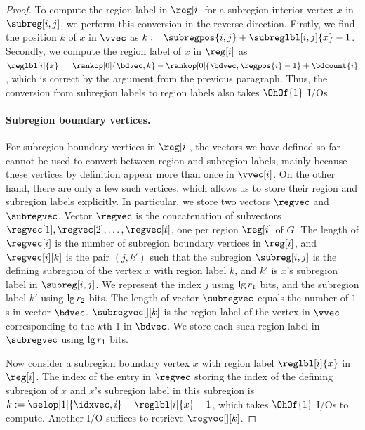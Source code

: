 \begin{proof}
  To compute the region label in $\reg[i]$ for a subregion-interior
  vertex $x$ in $\subreg[i,j]$, we perform this conversion in the reverse
  direction.
  Firstly, we find the position $k$ of $x$ in $\vvec$ as
  $k := \subregpos{i,j} + \subreglbl[i,j]{x} - 1$.
  Secondly, we compute the region label of $x$ in $\reg[i]$ as
  $\reglbl[i]{x} := \rankop[0]{\bdvec,k} - \rankop[0]{\bdvec,\regpos{i}-1} + \bdcount{i}$,
  which is correct by the argument from the previous paragraph.
  Thus, the conversion from subregion labels to region labels also takes
  $\OhOf{1}$ I/Os.

  \paragraph{Subregion boundary vertices.}

  For subregion boundary vertices in $\reg[i]$, the vectors we have defined so
  far cannot be used to convert between region and subregion labels, mainly
  because these vertices by definition appear more than once in $\vvec[i]$.
  On the other hand, there are only a few such vertices, which allows us to
  store their region and subregion labels explicitly.
  In particular, we store two vectors $\regvec$ and~$\subregvec$.
  Vector $\regvec$ is the concatenation of subvectors $\regvec[1], \regvec[2],
  \dots, \regvec[t]$, one per region $\reg[i]$ of $G$.
  The length of $\regvec[i]$ is the number of subregion boundary vertices
  in $\reg[i]$, and $\regvec[i][k]$ is the pair $(j,k')$ such that the
  subregion $\subreg[i,j]$ is the defining subregion of the vertex $x$
  with region label $k$, and $k'$ is $x$'s subregion label in $\subreg[i,j]$.
  We represent the index $j$ using $\lg r_1$ bits, and the subregion
  label $k'$ using $\lg r_2$ bits.
  The length of vector $\subregvec$ equals the number of $1$s in vector
  $\bdvec$.
  $\subregvec[][k]$ is the region label of the vertex in $\vvec$ corresponding
  to the $k$th $1$ in $\bdvec$.
  We store each such region label in $\subregvec$ using $\lg r_1$ bits.

  Now consider a subregion boundary vertex $x$ with region label
  $\reglbl[i]{x}$ in $\reg[i]$.
  The index of the entry in $\regvec$ storing the index of the defining
  subregion of $x$ and $x$'s subregion label in this subregion is 
  $k := \selop[1]{\idxvec,i} + \reglbl[i]{x} - 1$, which takes
  $\OhOf{1}$ I/Os to compute.
  Another I/O suffices to retrieve $\regvec[][k]$.


\end{proof}

